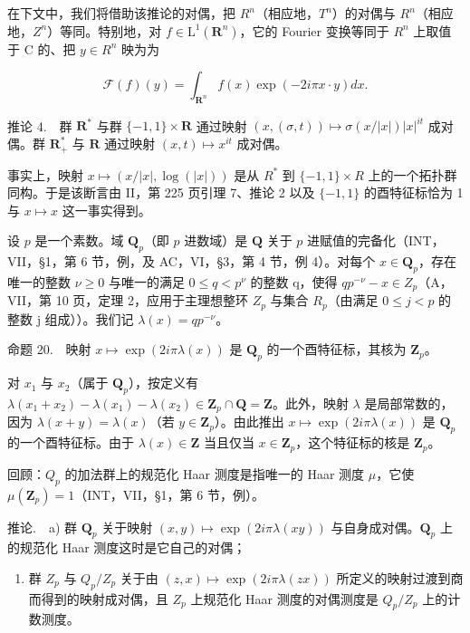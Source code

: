 在下文中，我们将借助该推论的对偶，把 \(R^{n}\)（相应地，\(T^{n}\)）的对偶与 \(R^{n}\)（相应地，\(Z^{n}\)）等同。特别地，对 \(f \in \mathrm{L}^{1}(\mathbf{R}^{n})\)，它的 Fourier 变换等同于 \(R^{n}\) 上取值于 C 的、把 \(y \in R^{n}\) 映为为

\[
\mathcal {F} (f) (y) = \int_ {\mathbf {R} ^ {n}} f (x) \exp (- 2 i \pi x \cdot y) d x.
\]

推论 4.　群 \(\mathbf{R}^{*}\) 与群 \(\{-1,1\} \times \mathbf{R}\) 通过映射 \((x,(\sigma,t)) \mapsto \sigma(x/|x|)|x|^{it}\) 成对偶。群 \(\mathbf{R}_{+}^{*}\) 与 \(\mathbf{R}\) 通过映射 \((x,t) \mapsto x^{it}\) 成对偶。

事实上，映射 \(x \mapsto (x/|x|, \log(|x|))\) 是从 \(R^{*}\) 到 \(\{-1, 1\} \times R\) 上的一个拓扑群同构。于是该断言由 II，第 225 页引理 7、推论 2 以及 \(\{-1, 1\}\) 的酉特征标恰为 1 与 \(x \mapsto x\) 这一事实得到。

设 \(p\) 是一个素数。域 \(\mathbf{Q}_{p}\)（即 \(p\) 进数域）是 \(\mathbf{Q}\) 关于 \(p\) 进赋值的完备化（INT，VII，§1，第 6 节，例，及 AC，VI，§3，第 4 节，例 4）。对每个 \(x \in \mathbf{Q}_{p}\)，存在唯一的整数 \(\nu\geqslant0\) 与唯一的满足 \(0\leqslant q<p^{\nu}\) 的整数 q，使得 \(qp^{-\nu}-x\in Z_{p}\)（A，VII，第 10 页，定理 2，应用于主理想整环 \(Z_{p}\) 与集合 \(R_{p}\)（由满足 \(0\leqslant j<p\) 的整数 j 组成））。我们记 \(\lambda(x)=qp^{-\nu}\)。

命题 20.　映射 \(x \mapsto \exp(2i\pi\lambda(x))\) 是 \(\mathbf{Q}_{p}\) 的一个酉特征标，其核为 \(\mathbf{Z}_{p}\)。

对 \(x_1\) 与 \(x_2\)（属于 \(\mathbf{Q}_p\)），按定义有 \(\lambda(x_1 + x_2) - \lambda(x_1) - \lambda(x_2) \in \mathbf{Z}_p \cap \mathbf{Q} = \mathbf{Z}\)。此外，映射 \(\lambda\) 是局部常数的，因为 \(\lambda(x + y) = \lambda(x)\)（若 \(y \in \mathbf{Z}_p\)）。由此推出 \(x \mapsto \exp(2i\pi\lambda(x))\) 是 \(\mathbf{Q}_p\) 的一个酉特征标。由于 \(\lambda(x) \in \mathbf{Z}\) 当且仅当 \(x \in \mathbf{Z}_p\)，这个特征标的核是 \(\mathbf{Z}_p\)。

回顾：\(Q_{p}\) 的加法群上的规范化 Haar 测度是指唯一的 Haar 测度 \(\mu\)，它使 \(\mu(\mathbf{Z}_{p}) = 1\)（INT，VII，§1，第 6 节，例）。

推论.　a) 群 \(\mathbf{Q}_{p}\) 关于映射 \((x,y)\mapsto\exp(2i\pi\lambda(xy))\) 与自身成对偶。\(\mathbf{Q}_{p}\) 上的规范化 Haar 测度这时是它自己的对偶；

\begin{enumerate}
\def\labelenumi{\alph{enumi})}
\setcounter{enumi}{1}
\tightlist
\item
  群 \(Z_{p}\) 与 \(Q_{p}/Z_{p}\) 关于由 \((z,x)\mapsto\exp(2i\pi\lambda(zx))\) 所定义的映射过渡到商而得到的映射成对偶，且 \(Z_{p}\) 上规范化 Haar 测度的对偶测度是 \(Q_{p}/Z_{p}\) 上的计数测度。
\end{enumerate}

